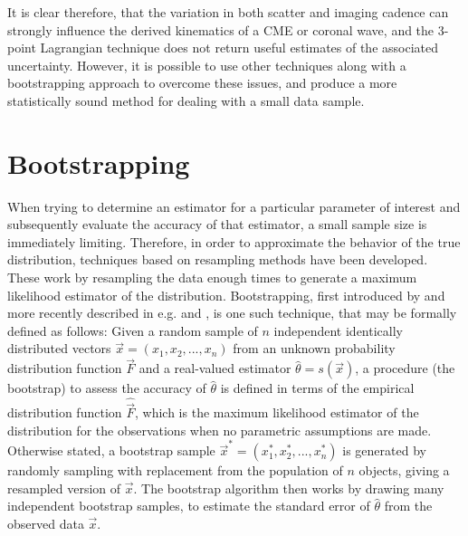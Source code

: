 \documentclass[structabstract]{aa}
\begin{document}


It is clear therefore, that the variation in both scatter and imaging cadence can strongly influence the derived kinematics of a CME or coronal wave, and the 3-point Lagrangian technique does not return useful estimates of the associated uncertainty. However, it is possible to use other techniques along with a bootstrapping approach to overcome these issues, and produce a more statistically sound method for dealing with a small data sample. 


\section{Bootstrapping}
\label{sect:bootstrapping}

When trying to determine an estimator for a particular parameter of interest and subsequently evaluate the accuracy of that estimator, a small sample size is immediately limiting. Therefore, in order to approximate the behavior of the true distribution, techniques based on resampling methods have been developed. These work by resampling the data enough times to generate a maximum likelihood estimator of the distribution. Bootstrapping, first introduced by \citet{Efron:1979p1831} and more recently described in e.g. \citet{1994.book.Efron} and \citet{Chernick1999}, is one such technique, that may be formally defined as follows: Given a random sample of $n$ independent identically distributed vectors $\vec{x} = \left( x_1, x_2, ..., x_n \right)$ from an unknown probability distribution function $\vec{F}$ and a real-valued estimator $\hat{\theta} = s \left( \vec{x} \right)$, a procedure (the bootstrap) to assess the accuracy of $\hat{\theta}$ is defined in terms of the empirical distribution function $\hat{\vec{F}}$, which is the maximum likelihood estimator of the distribution for the observations when no parametric assumptions are made. Otherwise stated, a bootstrap sample $\vec{x}^* = \left( x_1^*, x_2^*, ..., x_n^* \right)$ is generated by randomly sampling with replacement from the population of $n$ objects, giving a resampled version of $\vec{x}$. The bootstrap algorithm then works by drawing many independent bootstrap samples, to estimate the standard error of $\hat{\theta}$ from the observed data $\vec{x}$.
\end{document}
